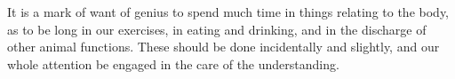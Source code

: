 It is a mark of want of genius to spend much time in things relating
to the body, as to be long in our exercises, in eating and drinking,
and in the discharge of other animal functions. These should be done
incidentally and slightly, and our whole attention be engaged in the
care of the understanding. 

